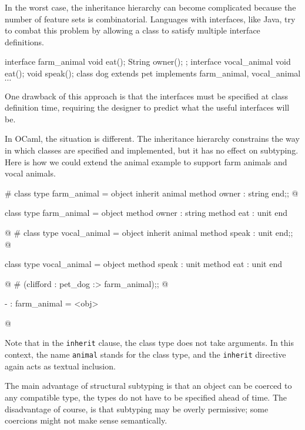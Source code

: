 In the worst case, the inheritance hierarchy can become complicated because the number of feature
sets is combinatorial.  Languages with interfaces, like Java, try to combat this problem by allowing
a class to satisfy multiple interface definitions.

\begin{java}
interface farm_animal { void eat(); String owner(); };
interface vocal_animal { void eat(); void speak(); }
class dog extends pet implements farm_animal, vocal_animal { $\cdots$ }
\end{java}
%
One drawback of this approach is that the interfaces must be specified at class definition time,
requiring the designer to predict what the useful interfaces will be.

In OCaml, the situation is different.  The inheritance hierarchy constrains the way in which classes
are specified and implemented, but it has no effect on subtyping.  Here is how we could extend the
animal example to support farm animals and vocal animals.

\label{classes:type-inherit}
\begin{ocaml}
# class type farm_animal =
  object
     inherit animal
     method owner : string
  end;;
@
\begin{topoutput}
class type farm_animal = object method owner : string method eat : unit end
\end{topoutput}
@
# class type vocal_animal =
  object
     inherit animal
     method speak : unit
  end;;
@
\begin{topoutput}
class type vocal_animal = object method speak : unit method eat : unit end
\end{topoutput}
@
# (clifford : pet_dog :> farm_animal);;
@
\begin{topoutput}
- : farm_animal = <obj>
\end{topoutput}
@
\end{ocaml}
%
Note that in the \hbox{\lstinline/inherit/} clause, the class type does not take arguments.  In this
context, the name \hbox{\lstinline/animal/} stands for the class type, and the \hbox{\lstinline/inherit/}
directive again acts as textual inclusion.

The main advantage of structural subtyping is that an object can be coerced to any compatible type,
the types do not have to be specified ahead of time.  The disadvantage of course, is that subtyping
may be overly permissive; some coercions might not make sense semantically.

